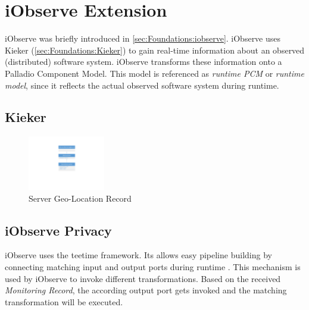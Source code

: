 
\chapter{iObserve Extension}
\label{ch:iObserve}

iObserve was briefly introduced in \autoref{sec:Foundations:iobserve}. iObserve uses Kieker (\autoref{sec:Foundations:Kieker}) to gain real-time information about an observed (distributed) software system. iObserve transforms these information onto a Palladio Component Model. This model is referenced as \textit{runtime PCM} or \textit{runtime model}, since it reflects the actual observed software system during runtime. \cite{Heinrich.2016}


\section{Kieker}
\label{sec:Kieker:privacy}


\begin{figure}[h]
	\centering
	\includegraphics[trim = 100mm 70mm 100mm 35mm, clip, width=0.30\textwidth]{graphs/GeoLocationRecord}
	\caption{Server Geo-Location Record}
	\label{fig:geoLocationRecord}
\end{figure}

\section{iObserve Privacy}
\label{sec:iObserve:privacy}

iObserve uses the teetime framework. Its allows easy pipeline building by connecting matching input and output ports during runtime \cite{teetime.16.05.2017}. This mechanism is used by iObserve to invoke different transformations. Based on the received \textit{Monitoring Record}, the according output port gets invoked and the matching transformation will be executed.

